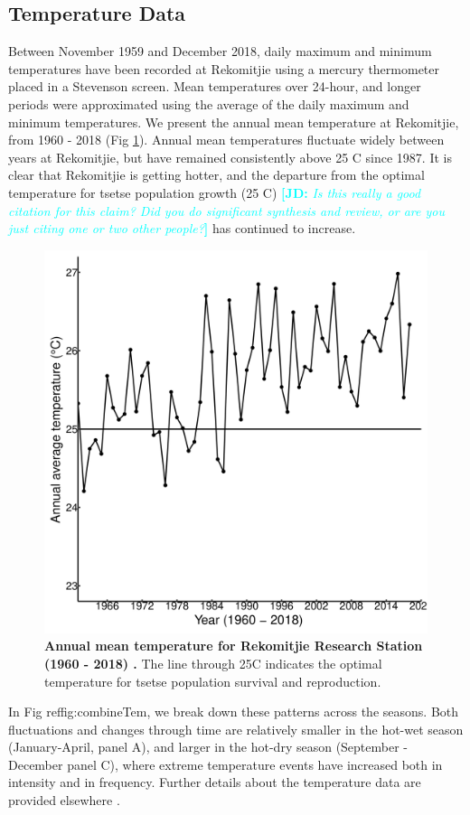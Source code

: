 \documentclass[12pt,a4paper]{article}
\newcommand{\comment}[3]{\textcolor{#1}{\textbf{[#2: }\textsl{#3}\textbf{]}}}
\newcommand{\jd}[1]{\comment{cyan}{JD}{#1}}
\begin{document}
\subsection*{Temperature Data}
Between November 1959 and December 2018, daily maximum and minimum temperatures have been recorded at Rekomitjie using a mercury thermometer placed in a Stevenson screen.  Mean temperatures over 24-hour, and longer periods were approximated using the average of the daily maximum and minimum temperatures. We present the annual mean temperature at Rekomitjie, from 1960 - 2018 (Fig \ref{fig:AnnualAveTem}). Annual mean temperatures fluctuate widely between years at Rekomitjie, but have remained consistently above 25 \degree C since 1987. It is clear that Rekomitjie is getting hotter, and the departure from the optimal temperature for tsetse population growth (25 \degree C) \cite{Are2019} \jd{Is this really a good citation for this claim? Did you do significant synthesis and review, or are you just citing one or two other people?} has continued to increase.  



\begin{figure}[hbt!]
	\centering
	\includegraphics[width=0.7\linewidth]{20April20AnnualAverageTemp1960to2018}
	\caption{{\bf Annual mean temperature for Rekomitjie Research Station (1960 - 2018) .} The line through 25\degree C indicates the optimal temperature for tsetse population survival and reproduction.}
	\label{fig:AnnualAveTem}
\end{figure}


\newpage
In Fig ref{fig:combineTem}, we break down these patterns across the seasons. Both fluctuations and changes through time are relatively smaller in the hot-wet season (January-April, panel A), and larger in the hot-dry season (September - December panel C), where extreme temperature events have increased both in intensity and in frequency. Further details about the temperature data are provided elsewhere \cite{Lord2018}.     
\end{document}
